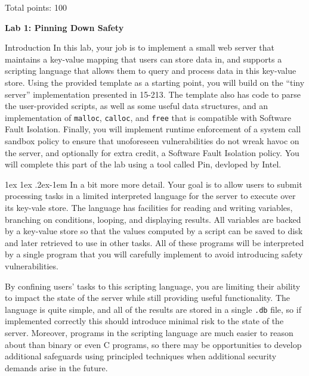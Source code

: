\documentclass[11pt]{article}
\makeatletter
\newcommand*{\stuname}{}
\renewcommand{\paragraph}{%
  \@startsection{paragraph}{4}%
  {\z@}{1ex \@plus 1ex \@minus .2ex}{-1em}%
  {\normalfont\normalsize\bfseries}
}
\newcommand*{\assignmentnumb}{1}
\makeatother
\begin{document}
Total points: 100 \\
\vspace{1.5ex}
\centerline{\Large\bf Lab \assignmentnumb: Pinning Down Safety}
\vspace{0.5ex}
\centerline{\Large\bf \stuname}

\begin{problem}{Introduction}
    In this lab, your job is to implement a small web server that maintains a key-value mapping that users can store data in, and supports a scripting language that allows them to query and process data in this key-value store.
    Using the provided template as a starting point, you will build on the ``tiny server'' implementation presented in 15-213.
    The template also has code to parse the user-provided scripts, as well as some useful data structures, and an implementation of \verb'malloc', \verb'calloc', and \verb'free' that is compatible with Software Fault Isolation.
    Finally, you will implement runtime enforcement of a system call sandbox policy to ensure that unoforeseen vulnerabilities do not wreak havoc on the server, and optionally for extra credit, a Software Fault Isolation policy.
    You will complete this part of the lab using a tool called Pin, devloped by Intel.
    
  \paragraph{In a bit more more detail.}
    Your goal is to allow users to submit processing tasks in a limited interpreted language for the server to execute over its key-vale store. 
    The language has facilities for reading and writing variables, branching on conditions, looping, and displaying results. 
    All variables are backed by a key-value store so that the values computed by a script can be saved to disk and later retrieved to use in other tasks. 
    All of these programs will be interpreted by a single program that you will carefully implement to avoid introducing safety vulnerabilities.
    
    By confining users' tasks to this scripting language, you are limiting their ability to impact the state of the server while still providing useful functionality. The language is quite simple, and all of the results are stored in a single \verb'.db' file, so if implemented correctly this should introduce minimal risk to the state of the server. Moreover, programs in the scripting language are much easier to reason about than binary or even C programs, so there may be opportunities to develop additional safeguards using principled techniques when additional security demands arise in the future.
  

\end{problem}
\end{document}
